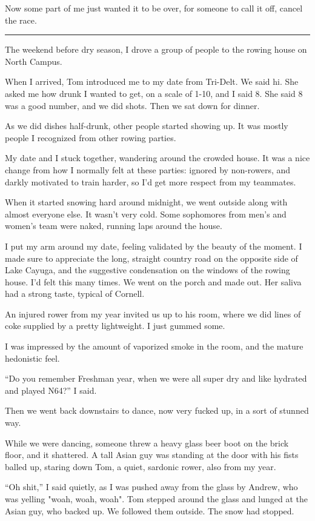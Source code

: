 Now some part of me just wanted it to be over, for someone to call it off,
cancel the race.

\plainfancybreak{12pt}{2}{* * *}

The weekend before dry season, I drove a group of people to the rowing house on
North Campus.

When I arrived, Tom introduced me to my date from Tri-Delt.  We said hi.  She
asked me how drunk I wanted to get, on a scale of 1-10, and I said 8.  She said
8 was a good number, and we did shots.  Then we sat down for dinner.

As we did dishes half-drunk, other people started showing up.  It was mostly
people I recognized from other rowing parties.  

My date and I stuck together, wandering around the crowded house. It was a nice
change from how I normally felt at these parties: ignored by non-rowers, and
darkly motivated to train harder, so I'd get more respect from my teammates.

When it started snowing hard around midnight, we went outside along with almost
everyone else.  It wasn't very cold.  Some sophomores from men's and women's
team were naked, running laps around the house.

I put my arm around my date, feeling validated by the beauty of the moment.   I
made sure to appreciate the long, straight country road on the opposite side of
Lake Cayuga, and the suggestive condensation on the windows of the rowing house.
I'd felt this many times.  We went on the porch and made out.  Her saliva had a
strong taste, typical of Cornell.

An injured rower from my year invited us up to his room, where we did lines of
coke supplied by a pretty lightweight.  I just gummed some.  

I was impressed by the amount of vaporized smoke in the room, and the mature
hedonistic feel.  

``Do you remember Freshman year, when we were all super dry and like hydrated
and played N64?'' I said.

Then we went back downstairs to dance, now very fucked up, in a sort of stunned
way.  

While we were dancing, someone threw a heavy glass beer boot on the brick floor,
and it shattered.  A tall Asian guy was standing at the door with his fists
balled up, staring down Tom, a quiet, sardonic rower, also from my year.  

``Oh shit,'' I said quietly, as I was pushed away from the glass by Andrew, who
was yelling "woah, woah, woah".  Tom stepped around the glass and lunged at the
Asian guy, who backed up. We followed them outside.  The snow had stopped.

